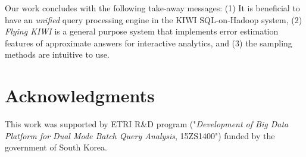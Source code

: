 \documentclass{sig-alternate-05-2015}
\begin{document}
Our work concludes with the following take-away messages:
(1) It is beneficial to have an \textit{unified} query processing engine in the KIWI SQL-on-Hadoop system,
(2) \textit{Flying KIWI} is a general purpose system that implements error estimation features of approximate answers for interactive analytics, and (3) the sampling methods are intuitive to use.

\section*{Acknowledgments}
This work was supported by ETRI R\&D program ("\textit{Development of Big Data Platform for Dual Mode Batch Query Analysis}, 15ZS1400") funded by the government of South Korea.

\small{


}
\end{document}

